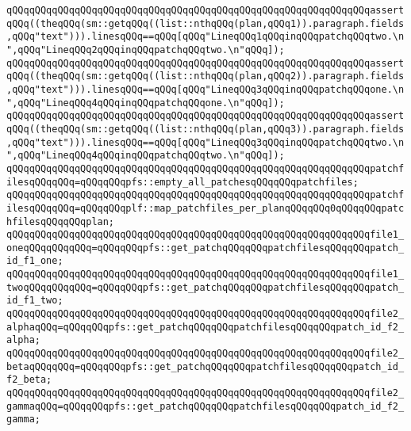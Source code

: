 \verb|qQQqqQQqqQQqqQQqqQQqqQQqqQQqqQQqqQQqqQQqqQQqqQQqqQQqqQQqqQQqqQQqassertqQQq((theqQQq(sm::getqQQq((list::nthqQQq(plan,qQQq1)).paragraph.fields,qQQq"text"))).linesqQQq==qQQq[qQQq"LineqQQq1qQQqinqQQqpatchqQQqtwo.\n",qQQq"LineqQQq2qQQqinqQQqpatchqQQqtwo.\n"qQQq]);|\newline
\verb|qQQqqQQqqQQqqQQqqQQqqQQqqQQqqQQqqQQqqQQqqQQqqQQqqQQqqQQqqQQqqQQqassertqQQq((theqQQq(sm::getqQQq((list::nthqQQq(plan,qQQq2)).paragraph.fields,qQQq"text"))).linesqQQq==qQQq[qQQq"LineqQQq3qQQqinqQQqpatchqQQqone.\n",qQQq"LineqQQq4qQQqinqQQqpatchqQQqone.\n"qQQq]);|\newline
\verb|qQQqqQQqqQQqqQQqqQQqqQQqqQQqqQQqqQQqqQQqqQQqqQQqqQQqqQQqqQQqqQQqassertqQQq((theqQQq(sm::getqQQq((list::nthqQQq(plan,qQQq3)).paragraph.fields,qQQq"text"))).linesqQQq==qQQq[qQQq"LineqQQq3qQQqinqQQqpatchqQQqtwo.\n",qQQq"LineqQQq4qQQqinqQQqpatchqQQqtwo.\n"qQQq]);|\newline
\newline
\verb|qQQqqQQqqQQqqQQqqQQqqQQqqQQqqQQqqQQqqQQqqQQqqQQqqQQqqQQqqQQqqQQqpatchfilesqQQqqQQq=qQQqqQQqpfs::empty_all_patchesqQQqqQQqpatchfiles;|\newline
\newline
\verb|qQQqqQQqqQQqqQQqqQQqqQQqqQQqqQQqqQQqqQQqqQQqqQQqqQQqqQQqqQQqqQQqpatchfilesqQQqqQQq=qQQqqQQqplf::map_patchfiles_per_planqQQqqQQq0qQQqqQQqpatchfilesqQQqqQQqplan;|\newline
\newline
\verb|qQQqqQQqqQQqqQQqqQQqqQQqqQQqqQQqqQQqqQQqqQQqqQQqqQQqqQQqqQQqqQQqfile1_oneqQQqqQQqqQQq=qQQqqQQqpfs::get_patchqQQqqQQqpatchfilesqQQqqQQqpatch_id_f1_one;|\newline
\verb|qQQqqQQqqQQqqQQqqQQqqQQqqQQqqQQqqQQqqQQqqQQqqQQqqQQqqQQqqQQqqQQqfile1_twoqQQqqQQqqQQq=qQQqqQQqpfs::get_patchqQQqqQQqpatchfilesqQQqqQQqpatch_id_f1_two;|\newline
\newline
\verb|qQQqqQQqqQQqqQQqqQQqqQQqqQQqqQQqqQQqqQQqqQQqqQQqqQQqqQQqqQQqqQQqfile2_alphaqQQq=qQQqqQQqpfs::get_patchqQQqqQQqpatchfilesqQQqqQQqpatch_id_f2_alpha;|\newline
\verb|qQQqqQQqqQQqqQQqqQQqqQQqqQQqqQQqqQQqqQQqqQQqqQQqqQQqqQQqqQQqqQQqfile2_betaqQQqqQQq=qQQqqQQqpfs::get_patchqQQqqQQqpatchfilesqQQqqQQqpatch_id_f2_beta;|\newline
\verb|qQQqqQQqqQQqqQQqqQQqqQQqqQQqqQQqqQQqqQQqqQQqqQQqqQQqqQQqqQQqqQQqfile2_gammaqQQq=qQQqqQQqpfs::get_patchqQQqqQQqpatchfilesqQQqqQQqpatch_id_f2_gamma;|\newline
\newline
